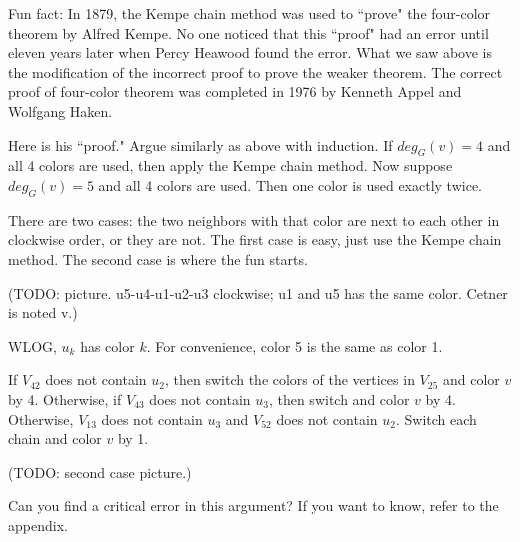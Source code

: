         Fun fact: In 1879, the Kempe chain method was used to ``prove" the four-color theorem by Alfred Kempe. No one noticed that this ``proof" had an error until eleven years later when Percy Heawood found the error. What we saw above is the modification of the incorrect proof to prove the weaker theorem. The correct proof of four-color theorem was completed in 1976 by Kenneth Appel and Wolfgang Haken.
        
        Here is his ``proof." Argue similarly as above with induction. If $deg_G(v) = 4$ and all 4 colors are used, then apply the Kempe chain method. Now suppose $deg_G(v) = 5$ and all 4 colors are used. Then one color is used exactly twice.
        
        There are two cases: the two neighbors with that color are next to each other in clockwise order, or they are not. The first case is easy, just use the Kempe chain method. The second case is where the fun starts.
        
        (TODO: picture. u5-u4-u1-u2-u3 clockwise; u1 and u5 has the same color. Cetner is noted v.)
        
        WLOG, $u_k$ has color $k$. For convenience, color 5 is the same as color 1.
        
        If $V_{42}$ does not contain $u_2$, then switch the colors of the vertices in $V_{25}$ and color $v$ by 4. Otherwise, if $V_{43}$ does not contain $u_3$, then switch and color $v$ by 4. Otherwise, $V_{13}$ does not contain $u_3$ and $V_{52}$ does not contain $u_2$. Switch each chain and color $v$ by 1.
        
        (TODO: second case picture.)
        
        Can you find a critical error in this argument? If you want to know, refer to the appendix.
    
